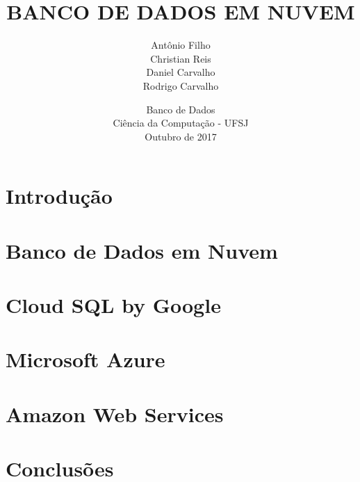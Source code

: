 \documentclass[oneside, titlepage]{article}
\title{BANCO DE DADOS EM NUVEM}
\author{Antônio Filho \\ Christian Reis \\ Daniel Carvalho \\ Rodrigo Carvalho }
\date{Banco de Dados \\ Ciência da Computação - UFSJ \\ Outubro de 2017}
\begin{document}
\maketitle

\tableofcontents
\newpage

\section{Introdução}

\section{Banco de Dados em Nuvem}

\section{Cloud SQL by Google}

\section{Microsoft Azure}

\section{Amazon Web Services}

\section{Conclusões}
\end{document}
